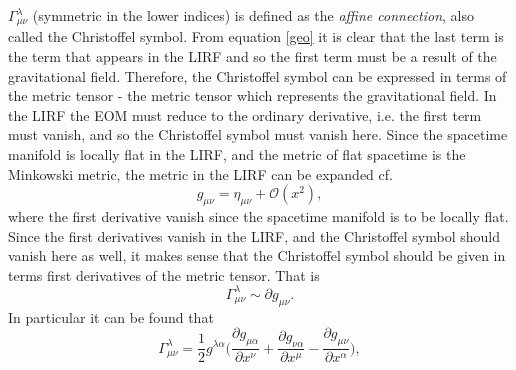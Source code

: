 $\Gamma^\lambda_{\mu\nu}$ (symmetric in the lower indices) is defined as the \emph{affine connection}, also called the Christoffel symbol. From equation \eqref{geo} it is clear that the last term is the term that appears in the LIRF and so the first term must be a result of the gravitational field. Therefore, the Christoffel symbol can be expressed in terms of the metric tensor - the metric tensor which represents the gravitational field. In the LIRF the EOM must reduce to the ordinary derivative, i.e. the first term must vanish, and so the Christoffel symbol must vanish here. Since the spacetime manifold is locally flat in the LIRF, and the metric of flat spacetime is the Minkowski metric, the metric in the LIRF can be expanded cf.
\begin{equation}
	g_{\mu\nu}=\eta_{\mu\nu}+\mathcal{O}(x^2),
\end{equation} 
where the first derivative vanish since the spacetime manifold is to be locally flat. Since the first derivatives vanish in the LIRF, and the Christoffel symbol should vanish here as well, it makes sense that the Christoffel symbol should be given in terms first derivatives of the metric tensor. That is
\begin{equation}
	\Gamma^\lambda_{\mu\nu}\sim\partial g_{\mu\nu}.
\end{equation} 
In particular it can be found that~\citep{Weinberg1972}
\begin{equation}
	\Gamma^\lambda_{\mu\nu}=\frac{1}{2}g^{\lambda\alpha}\bigg(\frac{\partial g_{\mu\alpha}}{\partial x^\nu}+\frac{\partial g_{\nu\alpha}}{\partial x^\mu}-\frac{\partial g_{\mu\nu}}{\partial x^\alpha}\bigg),
\end{equation} 

